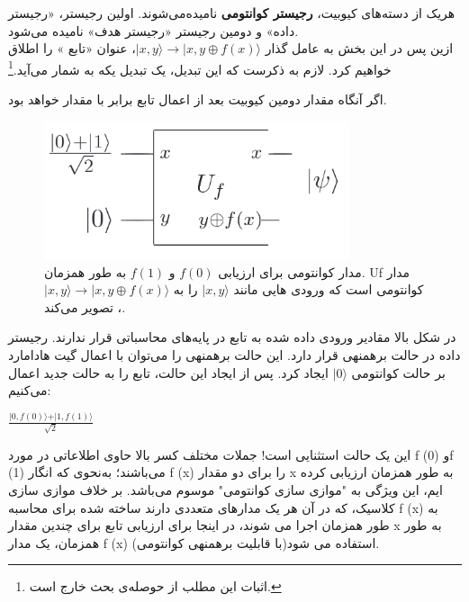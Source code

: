 \documentclass{book}
\begin{document}
هریک از دسته‌های کیوبیت، \textbf{رجیستر کوانتومی} نامیده‌می‌شوند. اولین رجیستر، «رجیستر داده» و دومین رجیستر «رجیستر هدف» نامیده می‌شود.\\
ازین پس در این بخش به عامل گذار $\vert x, y \rangle \rightarrow \vert x, y \oplus f(x) \rangle$، عنوان «تابع » را اطلاق خواهیم کرد. لازم به ذکرست که این تبدیل، یک تبدیل یکه به شمار می‌آید.\footnote{اثبات این مطلب از حوصله‌ی بحث خارج است.}


اگر  آنگاه مقدار دومین کیوبیت بعد از اعمال تابع  برابر با مقدار  خواهد بود.

 \begin{center}
 	 \begin{figure}[ht]
 		\centering
 		\includegraphics[width=0.8\textwidth]{Uforacle.png}
 		\caption{مدار کوانتومی برای ارزیابی $f (0)$ و $f (1)$ به طور همزمان. Uf مدار کوانتومی است که ورودی هایی مانند $\vert x, y\rangle$ را به $\vert x, y \rangle \rightarrow \vert x, y \oplus f(x) \rangle$، تصویر می‌کند.}
 	\end{figure}
 \end{center}

در شکل بالا مقادیر ورودی داده شده به تابع  در پایه‌های محاسباتی قرار ندارند. رجیستر داده در حالت برهمنهی  قرار دارد. این حالت برهمنهی را می‌توان با اعمال گیت هادامارد بر حالت کوانتومی $\vert 0 \rangle$ ایجاد کرد. پس از ایجاد این حالت، تابع  را به حالت جدید اعمال می‌کنیم:
\begin{center}
	$\frac{\vert 0,f(0) \rangle +\vert 1,f(1) \rangle }{\sqrt{2}}$
\end{center}

این یک حالت استثنایی است! جملات مختلف کسر بالا حاوی اطلاعاتی در مورد f (0) وf (1) می‌باشند؛ به‌نحوی که انگار f (x) را برای دو مقدار x به طور همزمان ارزیابی کرده ایم، این ویژگی به "موازی  سازی کوانتومی" موسوم می‌باشد. بر خلاف موازی سازی کلاسیک، که در آن هر یک مدارهای متعددی دارند ساخته شده برای محاسبه f (x) به طور همزمان اجرا می شوند، در اینجا برای ارزیابی تابع برای چندین مقدار x به طور همزمان، یک مدار f (x) (با قابلیت برهمنهی کوانتومی)استفاده می شود.
\end{document}
